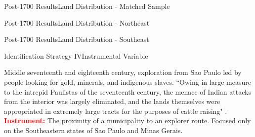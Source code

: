 \documentclass[aspectratio=1610]{beamer}
\begin{document}
\begin{frame}{Post-1700 Results}{Land Distribution - Matched Sample}
    \begin{figure}[h!]
        \begin{center}
        \end{center}
      \end{figure}
\end{frame}

\begin{frame}{Post-1700 Results}{Land Distribution - Northeast}
    \begin{figure}[h!]
        \begin{center}
        \end{center}
      \end{figure}
\end{frame}

\begin{frame}{Post-1700 Results}{Land Distribution - Southeast}
    \begin{figure}[h!]
        \begin{center}
        \end{center}
      \end{figure}
\end{frame}

\begin{frame}{Identification Strategy IV}{Instrumental Variable}
    \begin{outline}
        \1 Middle seventeenth and eighteenth century, exploration from Sao Paulo led by people looking for gold, minerals, and indigenous slaves.
        \vspace{2mm}
        \1 ``Owing in large measure to the intrepid Paulistas of the seventeenth century, the menace of Indian attacks from the interior was largely eliminated, and the lands themselves were appropriated in extremely large tracts for the purposes of cattle raising" \parencite[p.~320]{Smith1972-dv}.
        \pause
        \vspace{2mm}
        \1 \textbf{\textcolor{red}{Instrument:}} The proximity of a municipality to an explorer route. \hyperlink{bandeiras}{}
        \vspace{2mm}
        \1 Focused only on the Southeastern states of Sao Paulo and Minas Gerais.
    \end{outline}
\end{frame}
\end{document}
